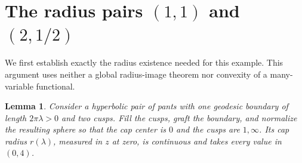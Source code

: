 \documentclass[11pt,a4paper]{article}
\newtheorem{lemma}[theorem]{Lemma}
\theoremstyle{definition}
\begin{document}
\section{The radius pairs \texorpdfstring{$(1,1)$ and $(2,1/2)$}{(1,1) and (2,1/2)}}
We first establish exactly the radius existence needed for this example. This argument uses neither a global radius-image theorem nor convexity of a many-variable functional.

\begin{lemma}\label{lem:radius-range}
Consider a hyperbolic pair of pants with one geodesic boundary of length $2\pi\lambda>0$ and two cusps. Fill the cusps, graft the boundary, and normalize the resulting sphere so that the cap center is $0$ and the cusps are $1,\infty$. Its cap radius $r(\lambda)$, measured in $z$ at zero, is continuous and takes every value in $(0,4)$.
\end{lemma}
\end{document}
